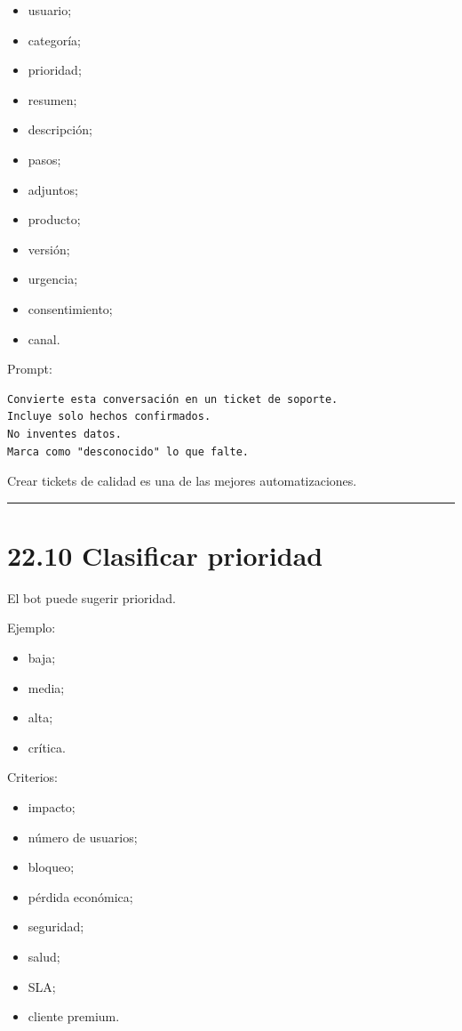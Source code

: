 \begin{itemize}
\tightlist
\item
  usuario;
\item
  categoría;
\item
  prioridad;
\item
  resumen;
\item
  descripción;
\item
  pasos;
\item
  adjuntos;
\item
  producto;
\item
  versión;
\item
  urgencia;
\item
  consentimiento;
\item
  canal.
\end{itemize}

Prompt:

\begin{lstlisting}
Convierte esta conversación en un ticket de soporte.
Incluye solo hechos confirmados.
No inventes datos.
Marca como "desconocido" lo que falte.
\end{lstlisting}

Crear tickets de calidad es una de las mejores automatizaciones.

\begin{center}\rule{0.5\linewidth}{0.5pt}\end{center}

\section{22.10 Clasificar prioridad}\label{clasificar-prioridad}

El bot puede sugerir prioridad.

Ejemplo:

\begin{itemize}
\tightlist
\item
  baja;
\item
  media;
\item
  alta;
\item
  crítica.
\end{itemize}

Criterios:

\begin{itemize}
\tightlist
\item
  impacto;
\item
  número de usuarios;
\item
  bloqueo;
\item
  pérdida económica;
\item
  seguridad;
\item
  salud;
\item
  SLA;
\item
  cliente premium.
\end{itemize}

